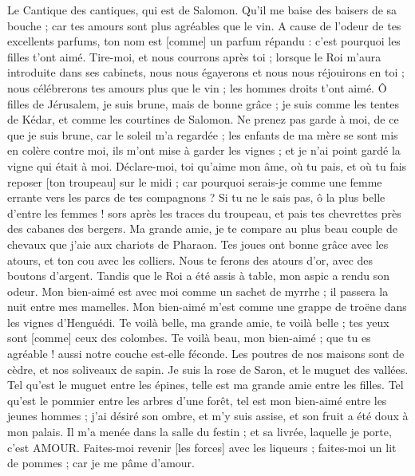 \BFont
\begin{multicols}{2}
\VerseOne{}Le Cantique des cantiques, qui est de Salomon. Qu'il me baise des baisers de sa bouche ; car tes amours sont plus agréables que le vin.
A cause de l'odeur de tes excellents parfums, ton nom est [comme] un parfum répandu : c'est pourquoi les filles t'ont aimé.
Tire-moi, et nous courrons après toi ; lorsque le Roi m'aura introduite dans ses cabinets, nous nous égayerons et nous nous réjouirons en toi ; nous célébrerons tes amours plus que le vin ; les hommes droits t'ont aimé.
Ô filles de Jérusalem, je suis brune, mais de bonne grâce ; je suis comme les tentes de Kédar, et comme les courtines de Salomon.
Ne prenez pas garde à moi, de ce que je suis brune, car le soleil m'a regardée ; les enfants de ma mère se sont mis en colère contre moi, ils m'ont mise à garder les vignes ; et je n'ai point gardé la vigne qui était à moi.
Déclare-moi, toi qu'aime mon âme, où tu pais, et où tu fais reposer [ton troupeau] sur le midi ; car pourquoi serais-je comme une femme errante vers les parcs de tes compagnons ?
Si tu ne le sais pas, ô la plus belle d'entre les femmes ! sors après les traces du troupeau, et pais tes chevrettes près des cabanes des bergers.
Ma grande amie, je te compare au plus beau couple de chevaux que j'aie aux chariots de Pharaon.
Tes joues ont bonne grâce avec les atours, et ton cou avec les colliers.
Nous te ferons des atours d'or, avec des boutons d'argent.
Tandis que le Roi a été assis à table, mon aspic a rendu son odeur.
Mon bien-aimé est avec moi comme un sachet de myrrhe ; il passera la nuit entre mes mamelles.
Mon bien-aimé m'est comme une grappe de troëne dans les vignes d'Henguédi.
Te voilà belle, ma grande amie, te voilà belle ; tes yeux sont [comme] ceux des colombes.
Te voilà beau, mon bien-aimé ; que tu es agréable ! aussi notre couche est-elle féconde.
Les poutres de nos maisons sont de cèdre, et nos soliveaux de sapin.
\VerseOne{}Je suis la rose de Saron, et le muguet des vallées.
Tel qu'est le muguet entre les épines, telle est ma grande amie entre les filles.
Tel qu'est le pommier entre les arbres d'une forêt, tel est mon bien-aimé entre les jeunes hommes ; j'ai désiré son ombre, et m'y suis assise, et son fruit a été doux à mon palais.
Il m'a menée dans la salle du festin ; et sa livrée, laquelle je porte, c'est AMOUR.
Faites-moi revenir [les forces] avec les liqueurs ; faites-moi un lit de pommes ; car je me pâme d'amour.

\end{multicols}
